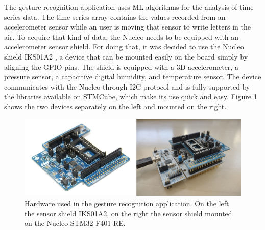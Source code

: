 \documentclass[12pt]{report}
\begin{document}
The gesture recognition application uses ML algorithms for the analysis of time series data. The time series array contains the values recorded from an accelerometer sensor while an user is moving that sensor to write letters in the air. To acquire that kind of data, the Nucleo needs to be equipped with an accelerometer sensor shield. For doing that, it was decided to use the Nucleo shield IKS01A2 \autocite{shield_web_page}, a device that can be mounted easily on the board simply by aligning the GPIO pins. The shield is equipped with a 3D accelerometer, a pressure sensor, a capacitive digital humidity, and temperature sensor. The device communicates with the Nucleo through I2C protocol and is fully supported by the libraries available on STMCube, which make its use quick and easy. Figure \ref{fig:hardware_stm} shows the two devices separately on the left and mounted on the right.\\

\begin{figure}[h!]
    \centering
    \includegraphics[width=120mm]{Figures/Chapter2/hardware_stm.jpg} 
    \caption{Hardware used in the gesture recognition application. On the left the sensor shield IKS01A2, on the right the sensor shield mounted on the Nucleo STM32 F401-RE.}
    \label{fig:hardware_stm}    
\end{figure}
\end{document}
